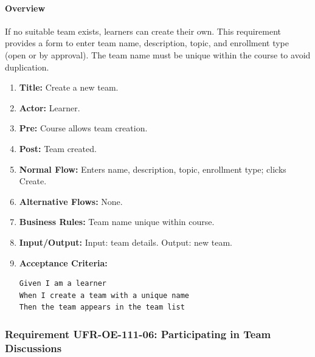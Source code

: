 \paragraph{Overview}
If no suitable team exists, learners can create their own. This requirement provides a form to enter team name, description, topic, and enrollment type (open or by approval). The team name must be unique within the course to avoid duplication.
\begin{enumerate}[label=\textbf{\arabic*.}]
\item \textbf{Title:} Create a new team.
\item \textbf{Actor:} Learner.
\item \textbf{Pre:} Course allows team creation.
\item \textbf{Post:} Team created.
\item \textbf{Normal Flow:} Enters name, description, topic, enrollment type; clicks Create.
\item \textbf{Alternative Flows:} None.
\item \textbf{Business Rules:} Team name unique within course.
\item \textbf{Input/Output:} Input: team details. Output: new team.
\item \textbf{Acceptance Criteria:}
    \begin{verbatim}
Given I am a learner
When I create a team with a unique name
Then the team appears in the team list
    \end{verbatim}
\end{enumerate}

\subsubsection{Requirement UFR-OE-111-06: Participating in Team Discussions}
